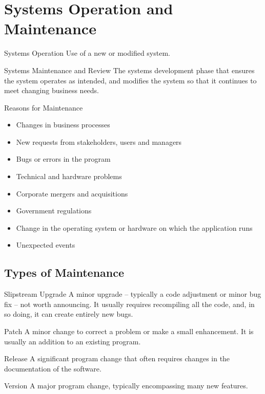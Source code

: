 \documentclass[\main/notes.tex]{subfiles}
\begin{document}
		\section[Systems Operation and Maintenance]{Systems Operation and Maintenance }
			\begin{definition}{Systems Operation}
				Use of a new or modified system.
			\end{definition}
			\begin{definition}{Systems Maintenance and Review}
				The systems development phase that ensures the system operates as intended, and modifies the system so that it continues to meet changing business needs.
			\end{definition}
			\begin{sidenote}{Reasons for Maintenance}
				\begin{multicols}{2}
					\begin{itemize}[nosep]
						\item Changes in business processes
						\item New requests from stakeholders, users and managers
						\item Bugs or errors in the program
						\item Technical and hardware problems
						\item Corporate mergers and acquisitions
						\item Government regulations
						\item Change in the operating system or hardware on which the application runs
						\item Unexpected events
					\end{itemize}
				\end{multicols}
			\end{sidenote}
			\subsection{Types of Maintenance}
				\begin{definition}{Slipstream Upgrade}
					A minor upgrade -- typically a code adjustment or minor bug fix -- not worth announcing. It usually requires recompiling all the code, and, in so doing, it can create entirely new bugs.
				\end{definition}
				\begin{definition}{Patch}
					A minor change to correct a problem or make a small enhancement. It is usually an addition to an existing program.
				\end{definition}
				\begin{definition}{Release}
					A significant program change that often requires changes in the documentation of the software.
				\end{definition}
				\begin{definition}{Version}
					A major program change, typically encompassing many new features.
				\end{definition}
\end{document}
